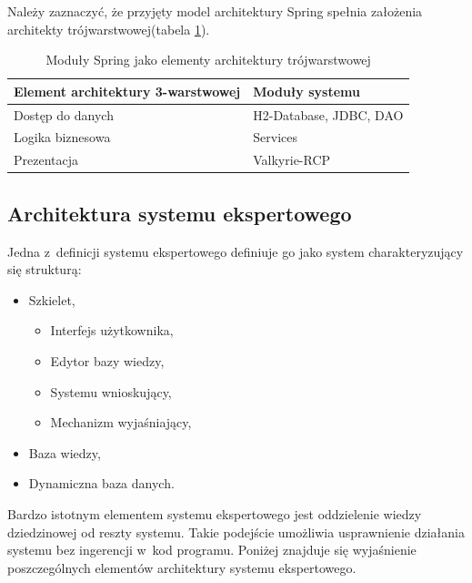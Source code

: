 Należy zaznaczyć, że przyjęty model architektury Spring spełnia założenia architekty trójwarstwowej(tabela \ref{tab:modules}).
\begin{table}[h]
 \caption{Moduły Spring jako elementy architektury trójwarstwowej}
 \small
 \selectfont
 \centering
 \vspace{0in}
 \begin{tabular}{|l|l|}
 \hline
 \textbf{Element architektury 3-warstwowej} & \textbf{Moduły systemu} \\ 
 \hline
 Dostęp do danych & H2-Database, JDBC, DAO \\
 \hline
 Logika biznesowa & Services \\
 \hline
 Prezentacja & Valkyrie-RCP \\
 \hline
 \end{tabular}
 \label{tab:modules}
\end{table}

\subsection{Architektura systemu ekspertowego}
\label{sec:architekturaSystemuEkspertowego}
Jedna z~definicji systemu ekspertowego definiuje go jako system charakteryzujący się strukturą\cite{goluchowski_eskpertowe}:
\begin{itemize}
 \item 	Szkielet,
       \begin{itemize}
	 \item Interfejs użytkownika,
	 \item Edytor bazy wiedzy,
	 \item Systemu wnioskujący,
	 \item Mechanizm wyjaśniający,
       \end{itemize}
 \item Baza wiedzy,
 \item Dynamiczna baza danych.
\end{itemize}

Bardzo istotnym elementem systemu ekspertowego jest oddzielenie wiedzy dziedzinowej od reszty systemu. Takie podejście umożliwia usprawnienie działania systemu bez ingerencji w~kod programu. Poniżej znajduje się wyjaśnienie poszczególnych elementów architektury systemu ekspertowego.

